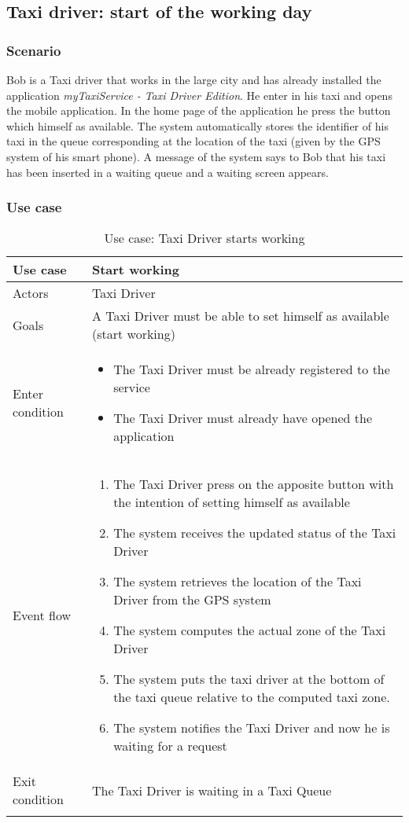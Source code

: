 \pagebreak
\subsection{Taxi driver: start of the working day}
\subsubsection{Scenario}
Bob is a Taxi driver that works in the large city and has already installed the application \textit{myTaxiService - Taxi Driver Edition}.
He enter in his taxi and opens the mobile application. In the home page of the application he press the button which himself as available. The system automatically stores the identifier of his taxi in the queue corresponding at the location of the taxi (given by the GPS system of his smart phone).
A message of the system says to Bob that his taxi has been inserted in a waiting queue and a waiting screen appears.

\subsubsection{Use case}
\begin{center}
\begin{longtable}{| p{} | p{} |} \hline
	Use case & \textbf{Start working} \\ \hline 
	Actors & Taxi Driver \\ \hline
	Goals & A Taxi Driver must be able to set himself as available (start working)  \\ \hline
	Enter condition & \begin{itemize}
						\item The Taxi Driver must be already registered to the service
						\item The Taxi Driver must already have opened the application
						\end{itemize} \\ \hline
	Event flow & \begin{enumerate}
					\item The Taxi Driver press on the apposite button with the intention of setting himself as available
					\item The system receives the updated status of the Taxi Driver
					\item The system retrieves the location of the Taxi Driver from the GPS system
					\item The system computes the actual zone of the Taxi Driver
					\item The system puts the taxi driver at the bottom of the taxi queue relative to the computed taxi zone.
					\item The system notifies the Taxi Driver and now he is waiting for a request
				\end{enumerate} \\ \hline
	Exit condition & The Taxi Driver is waiting in a Taxi Queue\\ \hline
	\caption{Use case: Taxi Driver starts working}
\end{longtable}
\end{center}